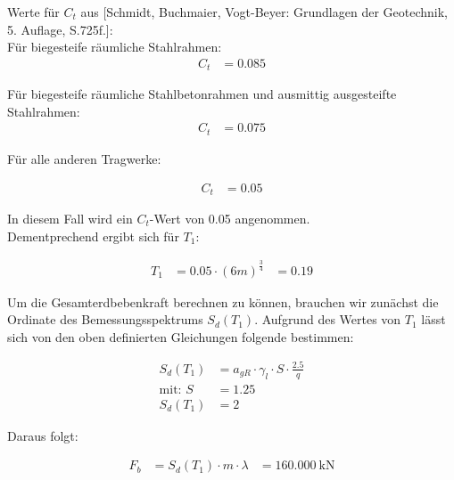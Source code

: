 \begin{solution}
    Werte für $C_t$ aus [Schmidt, Buchmaier, Vogt-Beyer: Grundlagen der Geotechnik, 5. Auflage, S.725f.]:
    \\
    Für biegesteife räumliche Stahlrahmen:
    \begin{align*}
        C_t &= 0.085  
    \end{align*}

    Für biegesteife räumliche Stahlbetonrahmen und ausmittig ausgesteifte Stahlrahmen:\\
    
    \begin{align*}
        C_t &= 0.075 
    \end{align*}

    Für alle anderen Tragwerke:

    \begin{align*}
        C_t &= 0.05 
    \end{align*}

    In diesem Fall wird ein $C_t$-Wert von 0.05 angenommen. \\
    Dementprechend ergibt sich für $T_1$:

    \begin{align*}
        T_1 &= 0.05 \cdot {(6m)}^{\frac{3}{4}} &= 0.19
    \end{align*}

    Um die Gesamterdbebenkraft berechnen zu können, brauchen wir zunächst die Ordinate des Bemessungsspektrums $S_d(T_1)$.
    Aufgrund des Wertes von $T_1$ lässt sich von den oben definierten Gleichungen folgende bestimmen: 

    \begin{align*}
        S_d(T_1) &= a_{gR} \cdot \gamma_l \cdot S \cdot \frac{2.5}{q}\\
        \text{mit: } S &= 1.25 \\
        S_d(T_1) &= 2 
    \end{align*}

    Daraus folgt:

    \begin{align*}
        F_b &= S_d(T_1) \cdot m \cdot \lambda &= \SI{160.000}{\kilo \newton}
    \end{align*}
\end{solution}